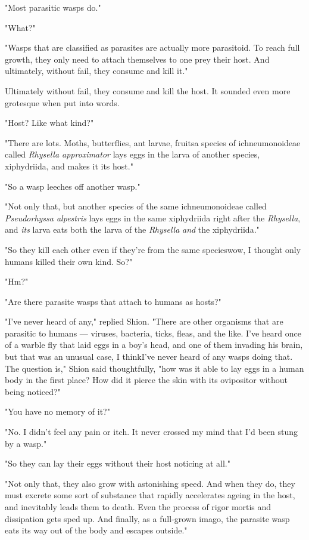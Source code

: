 "Most parasitic wasps do."

"What?"

"Wasps that are classified as parasites are actually more parasitoid. To
reach full growth, they only need to attach themselves to one prey\el 
their host. And ultimately, without fail, they consume and kill it."

Ultimately without fail, they consume and kill the host. It sounded even
more grotesque when put into words.

"Host? Like what kind?"

"There are lots. Moths, butterflies, ant larvae, fruits\el a species of
ichneumonoideae called \emph{Rhysella approximator} lays eggs in the larva of
another species, xiphydriida, and makes it its host."

"So a wasp leeches off another wasp."

"Not only that, but another species of the same ichneumonoideae called
\emph{\emph{Pseudorhyssa alpestris}} lays eggs in the same xiphydriida right after the
\emph{Rhysella}, and \emph{its} larva eats both the larva of the \emph{Rhysella} \emph{and} the
xiphydriida."

"So they kill each other even if they're from the same species\el wow, I
thought only humans killed their own kind. So?"

"Hm?"

"Are there parasite wasps that attach to humans as hosts?"

"I've never heard of any," replied Shion. "There are other organisms
that are parasitic to humans --- viruses, bacteria, ticks, fleas, and the
like. I've heard once of a warble fly that laid eggs in a boy's head,
and one of them invading his brain, but that was an unusual case, I
think\el I've never heard of any wasps doing that. The question is,"
Shion said thoughtfully, "how was it able to lay eggs in a human body in
the first place? How did it pierce the skin with its ovipositor without
being noticed?"

"You have no memory of it?"

"No. I didn't feel any pain or itch. It never crossed my mind that I'd
been stung by a wasp."

"So they can lay their eggs without their host noticing at all."

"Not only that, they also grow with astonishing speed. And when they do,
they must excrete some sort of substance that rapidly accelerates ageing
in the host, and inevitably leads them to death. Even the process of
rigor mortis and dissipation gets sped up. And finally, as a full-grown
imago, the parasite wasp eats its way out of the body and escapes
outside."

